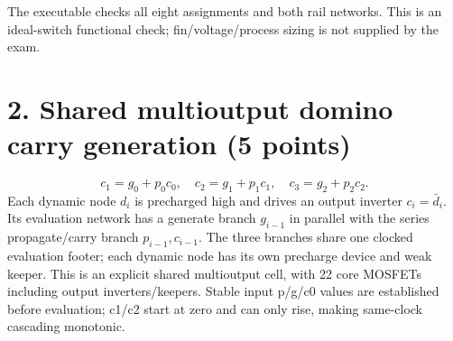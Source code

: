 \documentclass[10pt]{article}
\begin{document}
The executable checks all eight assignments and both rail networks. This is an ideal-switch functional check; fin/voltage/process sizing is not supplied by the exam.

\newpage\section*{2. Shared multioutput domino carry generation (5 points)}
\[
c_1=g_0+p_0c_0,\quad c_2=g_1+p_1c_1,
\quad c_3=g_2+p_2c_2.
\]
Each dynamic node $d_i$ is precharged high and drives an output inverter $c_i=\bar d_i$. Its evaluation network has a generate branch $g_{i-1}$ in parallel with the series propagate/carry branch $p_{i-1},c_{i-1}$. The three branches share one clocked evaluation footer; each dynamic node has its own precharge device and weak keeper. This is an explicit shared multioutput cell, with 22 core MOSFETs including output inverters/keepers. Stable input p/g/c0 values are established before evaluation; c1/c2 start at zero and can only rise, making same-clock cascading monotonic.
\providecommand{\auditmos}[4]{\begin{scope}[shift={(#1,#2)}]
\draw (0,.24)--(0,-.24);\draw (0,.20)--(.25,.20)--(.25,.5);
\draw (0,-.20)--(.25,-.20)--(.25,-.5);\draw (-.16,.23)--(-.16,-.23);
\ifnum#4=1\draw (-.26,0) circle (.06);\draw (-.75,0)--(-.32,0);
\else\draw (-.75,0)--(-.16,0);\fi
\node[anchor=east] at (-.76,0) {$#3$};\end{scope}}
\end{document}
